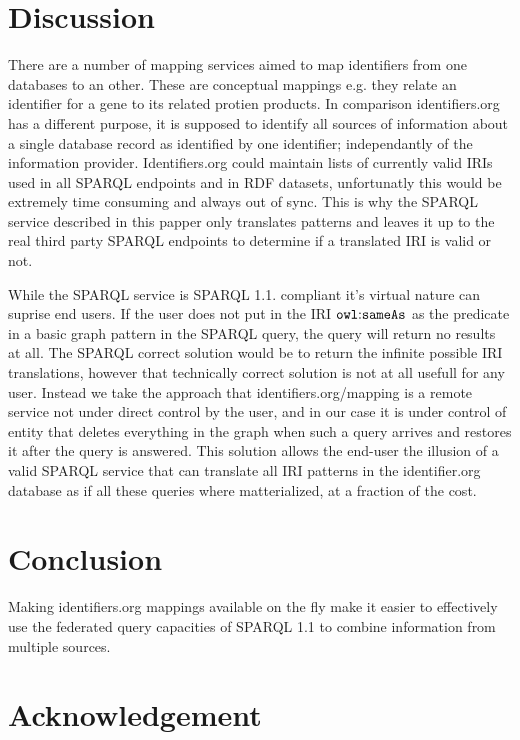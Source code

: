 \documentclass{bioinfo}
\begin{document}
\begin{methods}
\end{methods}



\section{Discussion}

There are a number of mapping services aimed to map identifiers from one databases to an other.
These are conceptual mappings e.g. they relate an identifier for a gene to its related protien products.
In comparison identifiers.org has a different purpose, it is supposed to identify all sources of information about a single database record as identified by one identifier; independantly of the information provider.
Identifiers.org could maintain lists of currently valid IRIs used in all SPARQL endpoints and in RDF datasets,
unfortunatly this would be extremely time consuming and always out of sync.
This is why the SPARQL service described in this papper only translates patterns and leaves it up to the real third party SPARQL endpoints to determine if a translated IRI is valid or not.

While the SPARQL service is SPARQL 1.1. compliant it's virtual nature can suprise end users.
If the user does not put in the IRI $\mathtt{owl\text{\rm :}{}sameAs}$ as the predicate in a basic graph pattern in the SPARQL query, the query will return no results at all.
The SPARQL correct solution would be to return the infinite possible IRI translations,
however that technically correct solution is not at all usefull for any user.
Instead we take the approach that identifiers.org/mapping is a remote service not under direct control by the user,
and in our case it is under control of entity that deletes everything in the graph when such a query arrives and restores it after the query is answered.
This solution allows the end-user the illusion of a valid SPARQL service that can translate all IRI patterns in the identifier.org database as if all these
queries where matterialized, at a fraction of the cost. 

\section{Conclusion}
Making identifiers.org mappings available on the fly make it easier to effectively use the federated query capacities of SPARQL 1.1 to combine information from multiple sources.

\section*{Acknowledgement}
\end{document}

